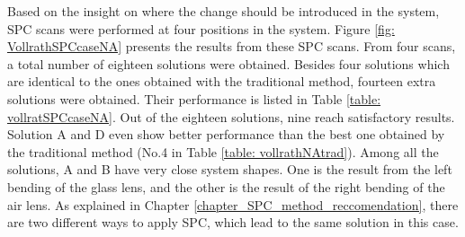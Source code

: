 Based on the insight on where the change should be introduced in the system, SPC scans were performed at four positions in the system. Figure \ref{fig: VollrathSPCcaseNA} presents the results from these SPC scans. From four scans, a total number of eighteen solutions were obtained. Besides four solutions which are identical to the ones obtained with the traditional method, fourteen extra solutions were obtained. Their performance is listed in Table \ref{table: vollratSPCcaseNA}. Out of the eighteen solutions, nine reach satisfactory results. Solution A and D even show better performance than the best one obtained by the traditional method (No.4 in Table \ref{table: vollrathNAtrad}). Among all the solutions, A and B have very close system shapes. One is the result from the left bending of the glass lens, and the other is the result of the right bending of the air lens. As explained in Chapter \ref{chapter_SPC_method_reccomendation}, there are two different ways to apply SPC, which lead to the same solution in this case.

\begin{figure}
\end{figure}

